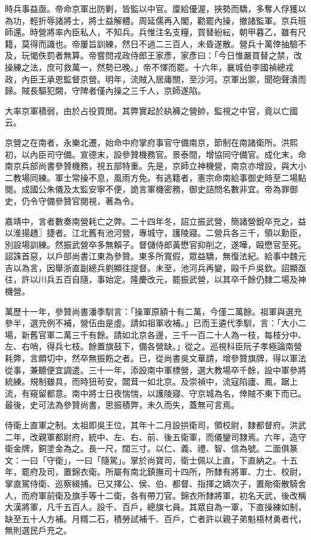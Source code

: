 時兵事益亟。帝命京軍出防剿，皆監以中官。廩給優渥，挾勢而驕，多奪人俘獲以為功，輕折辱諸將士，將士益解體。周延儒再入閣，勸罷內操，撤諸監軍。京兵班師還。時營將率內臣私人，不知兵。兵惟注名支糧，買替紛紜，朝甲暮乙，雖有尺籍，莫得而識也。帝屢旨訓練，然日不過二三百人，未昏遂散。營兵十萬倖抽驗不及，玩愒佚罰者無算。帝嘗問戎政侍郎王家彥，家彥曰：「今日惟嚴買替之禁，改操練之法，庶可救萬一，然勢已晚。」帝不懌而罷。十六年，襄城伯李國禎總戎政，內臣王承恩監督京營。明年，流賊入居庸關，至沙河。京軍出禦，聞砲聲潰而歸。賊長驅犯闕，守陴者僅內操之三千人，京師遂陷。

大率京軍積弱，由於占役買閒。其弊實起於紈褲之營帥，監視之中官，竟以亡國云。

京營之在南者，永樂北遷，始命中府掌府事官守備南京，節制在南諸衛所。洪熙初，以內臣司守備。宣德末，設參贊機務官。景泰間，增協同守備官。成化末，命南京兵部尚書參贊機務，視五部特重。先是，京師立神機營，南京亦增設，與大小二教場同練。軍士常操不息，風雨方免。有逃籍者，憲宗命南給事御史時至二場點閱。成國公朱儀及太監安寧不便，詭言軍機密務，御史詰問名數非宜。帝為罪御史，仍令守備參贊官閱視，著為令。

嘉靖中，言者數奏南營耗亡之弊。二十四年冬，詔立振武營，簡諸營銳卒充之，益以淮揚趫〗捷者。江北舊有池河營，專城守，護陵寢。二營兵各三千，領以勳臣，別設場訓練。然振武營卒多無賴子。督儲侍郎黃懋官抑削之，遂嘩，毆懋官至死。詔誅首惡，以戶部尚書江東為參贊。東多所寬假，眾益驕，無復法紀。給事中魏元吉以為言，因舉浙直副總兵劉顯往提督。未至，池河兵再變，毆千戶吳欽。詔顯亟往，許以川兵五百自隨，事始定。隆慶改元，罷振武營，以其卒千餘仍隸二場及神機營。

萬歷十一年，參贊尚書潘季馴言：「操軍原額十有二萬，今僅二萬餘。祖軍與選充參半，選充例不補，營伍由是虛。請如祖軍收補。」已而王遴代季馴，言：「大小二場，新舊官軍二萬三千有餘。請如北京各邊，三千一百二十人為一枝，每枝分中、左、右哨，得兵七枝。餘置旗鼓下，備各營缺。」從之。巡視科臣阮子孝極論南營耗弊，言頗切中，然卒無振飭之者。已，從尚書吳文華請，增參贊旗牌，得以軍法從事，兼聽便宜調遣。三十一年，添設南中軍標營，選大教場卒千餘，設中軍參將統練。規制雖具，而時狃茍安，闒茸一如北京。及崇禎中，流寇陷廬、鳳，踞上流，有窺留都意。南中將士日夜惴惴，以護陵寢、守京城為名，倖賊不東下而已。最後，史可法為參贊尚書，思振積弊，未久而失，蓋無可言焉。

侍衛上直軍之制。太祖即吳王位，其年十二月設拱衛司，領校尉，隸都督府。洪武二年，改親軍都尉府，統中、左、右、前、後五衛軍，而儀鑾司隸焉。六年，造守衛金牌，銅塗金為之。長一尺，闊三寸。以仁、義、禮、智、信為號。二面俱篆文：一曰「守衛」，一曰「隨駕」。掌於尚寶司，衛士佩以上直，下直納之。十五年，罷府及司，置錦衣衛。所屬有南北鎮撫司十四所，所隸有將軍、力士、校尉，掌直駕侍衛、巡察緝捕。已又擇公、侯、伯、都督、指揮之嫡次子，置勛衛散騎舍人，而府軍前衛及旗手等十二衛，各有帶刀官。錦衣所隸將軍，初名天武，後改稱大漢將軍，凡千五百人。設千、百戶，總旗七員。其眾自為一軍，下直操練如制，缺至五十人方補。月糈二石，積勞試補千、百戶，亡者許以親子弟魁梧材勇者代，無則選民戶充之。

